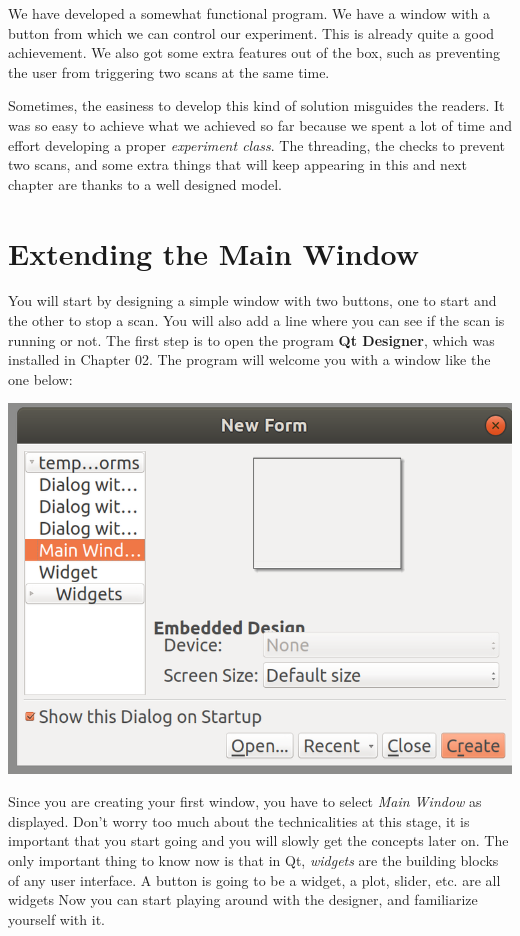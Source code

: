 We have developed a somewhat functional program. We have a window with a button from which we can control our experiment. This is already quite a good achievement. We also got some extra features out of the box, such as preventing the user from triggering two scans at the same time.

Sometimes, the easiness to develop this kind of solution misguides the readers. It was so easy to achieve what we achieved so far because we spent a lot of time and effort developing a proper \emph{experiment class}. The threading, the checks to prevent two scans, and some extra things that will keep appearing in this and next chapter are thanks to a well designed model.

\section{Extending the Main Window}\label{section:extending-main-window}

You will start by designing a simple window with two buttons, one to
start and the other to stop a scan. You will also add a line where you
can see if the scan is running or not. The first step is to open the
program \textbf{Qt Designer}, which was installed in Chapter 02. The
program will welcome you with a window like the one below:

\begin{center}
    \includegraphics[width=.6\textwidth]{images/qt_designer_welcome.png}
\end{center}

Since you are creating your first window, you have to select \emph{Main
Window} as displayed. Don't worry too much about the technicalities at
this stage, it is important that you start going and you will slowly get
the concepts later on. The only important thing to know now is that in
Qt, \emph{widgets} are the building blocks of any user interface. A
button is going to be a widget, a plot, slider, etc. are all widgets Now
you can start playing around with the designer, and familiarize yourself
with it.

